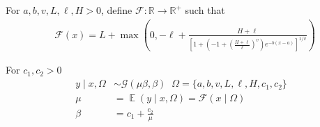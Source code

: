 \documentclass[a4paper,12pt]{article}
\DeclareMathOperator{\E}{\mathbb{E}}
\begin{document}
    For $a, b, v, L, \ell, H > 0$, define $\mathcal{F}: \mathbb{R} \to \mathbb{R}^{+}$ such that
    \begin{align*}
        &\mathcal{F}\left(x\right) = L + \max\left(0, -\ell + \frac{H + \ell}{\left[1 + \left(-1 + \left(\frac{H + \ell}{\ell}\right)^{v}\right)e^{-b(x-a)}\right]^{1/v}} \right) \tag{4.2.1}
    \end{align*}


For $c_1, c_2 > 0$
    \begin{align*}
    y \mid x, \Omega &\sim \mathcal{G}\left(\mu\beta, \beta\right) \;\; \Omega = \{ a, b, v, L, \ell, H, c_1, c_2\} \tag{4.2.2} \\
    \mu &= \E\left(y \mid x, \Omega\right) = \mathcal{F}\left(x \mid \Omega\right) \tag{4.2.3}\\
    \beta &= c_1 + \frac{c_2}{\mu} \tag{4.2.4}\\
    \end{align*}
\end{document}
